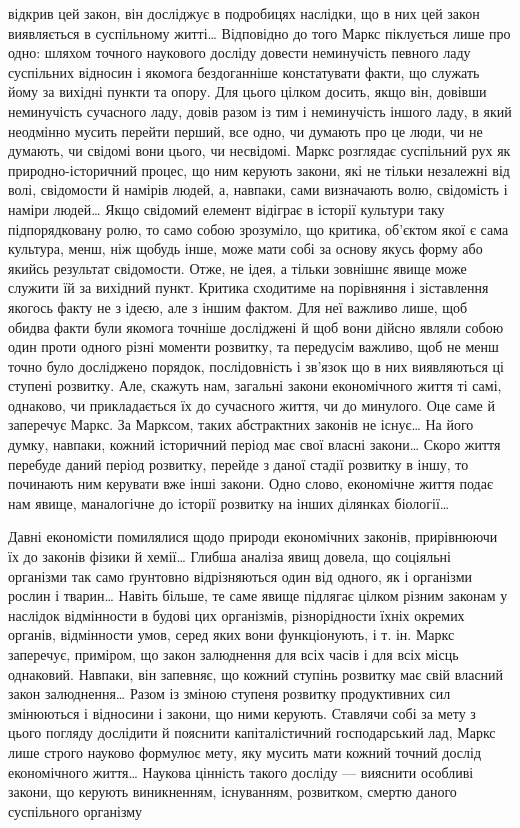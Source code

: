 \parcont{}  %
відкрив цей закон, він досліджує в подробицях наслідки, що в
них цей закон виявляється в суспільному житті\dots{} Відповідно до
того Маркс піклується лише про одно: шляхом точного наукового
досліду довести неминучість певного ладу суспільних відносин
і якомога бездоганніше констатувати факти, що служать йому
за вихідні пункти та опору. Для цього цілком досить, якщо він,
довівши неминучість сучасного ладу, довів разом із тим і неминучість
іншого ладу, в який неодмінно мусить перейти перший, все
одно, чи думають про це люди, чи не думають, чи свідомі вони
цього, чи несвідомі. Маркс розглядає суспільний рух як природно-історичний
процес, що ним керують закони, які не тільки незалежні
від волі, свідомости й намірів людей, а, навпаки, сами
визначають волю, свідомість і наміри людей\dots{} Якщо свідомий
елемент відіграє в історії культури таку підпорядковану ролю,
то само собою зрозуміло, що критика, об’єктом якої є сама культура,
менш, ніж щобудь інше, може мати собі за основу якусь форму
або якийсь результат свідомости. Отже, не ідея, а тільки зовнішнє
явище може служити їй за вихідний пункт. Критика сходитиме
на порівняння і зіставлення якогось факту не з ідеєю, але з іншим
фактом. Для неї важливо лише, щоб обидва факти були якомога
точніше досліджені й щоб вони дійсно являли собою один проти
одного різні моменти розвитку, та передусім важливо, щоб не
менш точно було досліджено порядок, послідовність і зв’язок
що в них виявляються ці ступені розвитку. Але, скажуть нам,
загальні закони економічного життя ті самі, однаково, чи
прикладається їх до сучасного життя, чи до минулого. Оце саме
й заперечує Маркс. За Марксом, таких абстрактних законів не
існує\dots{} На його думку, навпаки, кожний історичний період має
свої власні закони\dots{} Скоро життя перебуде даний період розвитку,
перейде з даної стадії розвитку в іншу, то починають ним керувати
вже інші закони. Одно слово, економічне життя подає нам
явище, маналогічне до історії розвитку на інших ділянках біології\dots{}

Давні економісти помилялися щодо природи економічних законів,
прирівнюючи їх до законів фізики й хемії\dots{} Глибша аналіза
явищ довела, що соціяльні організми так само ґрунтовно відрізняються
один від одного, як і організми рослин і тварин\dots{} Навіть
більше, те саме явище підлягає цілком різним законам у наслідок
відмінности в будові цих організмів, різнорідности їхніх окремих
органів, відмінности умов, серед яких вони функціонують, і т. ін.
Маркс заперечує, приміром, що закон залюднення для всіх часів
і для всіх місць однаковий. Навпаки, він запевняє, що кожний
ступінь розвитку має свій власний закон залюднення\dots{} Разом із
зміною ступеня розвитку продуктивних сил змінюються і відносини
і закони, що ними керують. Ставлячи собі за мету з цього
погляду дослідити й пояснити капіталістичний господарський лад,
Маркс лише строго науково формулює мету, яку мусить мати
кожний точний дослід економічного життя\dots{} Наукова цінність
такого досліду — вияснити особливі закони, що керують виникненням,
існуванням, розвитком, смертю даного суспільного організму
\parbreak{}  %
